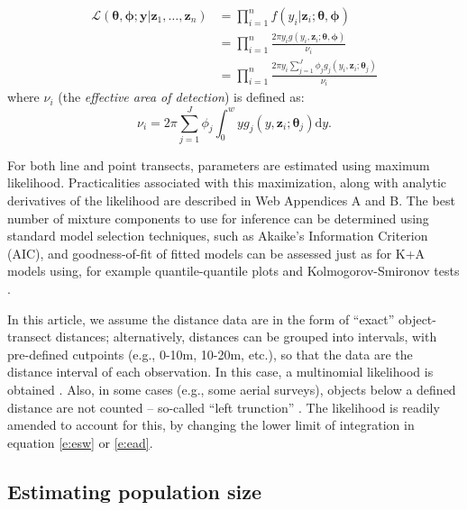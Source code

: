 \documentclass[useAMS,referee,usenatbib]{biom}
\begin{document}
\begin{align*}
\mathcal{L}(\bm{\theta},\bm{\phi}; \mathbf{y}  \vert \bm{z}_1, \ldots, \bm{z}_n) &= \prod_{i=1}^n f(y_i \vert \bm{z}_i; \bm{\theta},\bm{\phi})\\
&= \prod_{i=1}^n \frac{2 \pi y_i g(y_i,\bm{z}_i; \bm{\theta},\bm{\phi})}{\nu_i}\\
&= \prod_{i=1}^n \frac{2 \pi y_i \sum_{j=1}^J \phi_j g_j(y_i,\bm{z}_i; \bm{\theta}_j)}{\nu_i}
\end{align*}
where $\nu_i$ (the \textit{effective area of detection}) is defined as:
\begin{equation}
\label{e:ead}
\nu_i = 2\pi \sum_{j=1}^J \phi_j \int_0^w  y g_j(y,\bm{z}_i; \bm{\theta}_j) \text{d}y.
\end{equation}

For both line and point transects, parameters are estimated using maximum likelihood. Practicalities associated with this maximization, along with analytic derivatives of the likelihood are described in Web Appendices A and B.  The best number of mixture components to use for inference can be determined using standard model selection techniques, such as Akaike's Information Criterion (AIC), and goodness-of-fit of fitted models can be assessed just as for K+A models using, for example quantile-quantile plots and Kolmogorov-Smironov tests \citep[see][Section 11.11]{Buckland:2004ts}.

In this article, we assume the distance data are in the form of ``exact'' object-transect distances; alternatively, distances can be grouped into intervals, with pre-defined cutpoints (e.g., 0-10m, 10-20m, etc.), so that the data are the distance interval of each observation.  In this case, a multinomial likelihood is obtained \citep[see, e.g.][Section 3.3.2]{Buckland:2001vm}.  Also, in some cases (e.g., some aerial surveys), objects below a defined distance are not counted -- so-called ``left trunction'' \citep[][Section 4.3.2]{Buckland:2001vm}.  The likelihood is readily amended to account for this, by changing the lower limit of integration in equation \eqref{e:esw} or \eqref{e:ead}.

\subsection{Estimating population size}
\label{s:popsize}
\end{document}
